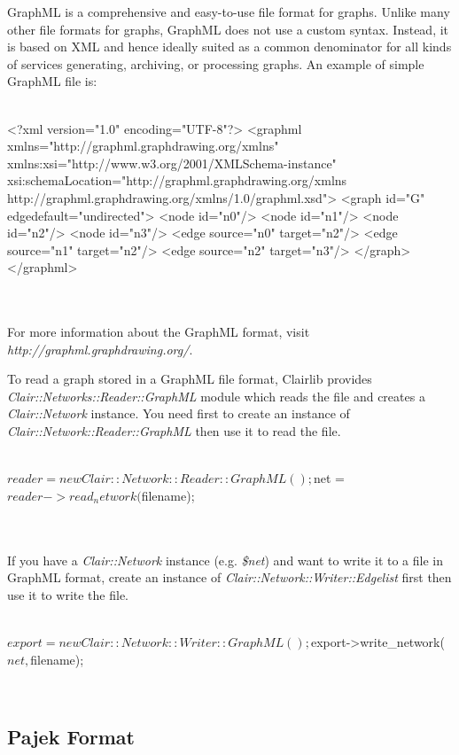 GraphML is a comprehensive and easy-to-use file format for graphs. Unlike many other file formats for graphs, GraphML does not use a custom syntax. Instead, it is based on XML and hence ideally suited as a common denominator for all kinds of services generating, archiving, or processing graphs. An example of simple GraphML file is:
\\
\\
\begin{boxedverbatim}
<?xml version="1.0" encoding="UTF-8"?>
<graphml xmlns="http://graphml.graphdrawing.org/xmlns"
    xmlns:xsi="http://www.w3.org/2001/XMLSchema-instance"
    xsi:schemaLocation="http://graphml.graphdrawing.org/xmlns
     http://graphml.graphdrawing.org/xmlns/1.0/graphml.xsd">
  <graph id="G" edgedefault="undirected">
    <node id="n0"/>
    <node id="n1"/>
    <node id="n2"/>
    <node id="n3"/>
    <edge source="n0" target="n2"/>
    <edge source="n1" target="n2"/>
    <edge source="n2" target="n3"/>
  </graph>
</graphml>
\end{boxedverbatim}
\\
\\
For more information about the GraphML format, visit \emph{http://graphml.graphdrawing.org/}.

To read a graph stored in a GraphML file format, Clairlib provides \emph{Clair::Networks::Reader::GraphML} module which reads the file and creates a \emph{Clair::Network} instance. You need first to create an instance of \emph{Clair::Network::Reader::GraphML} then use it to read the file.
\\
\\
\begin{boxedverbatim}
$reader = new Clair::Network::Reader::GraphML();
$net = $reader->read_network($filename);
\end{boxedverbatim}
\\
\\
If you have a \emph{Clair::Network} instance (e.g. \emph{\$net}) and want to write it to a file in GraphML format, create an instance of \emph{Clair::Network::Writer::Edgelist} first then use it to write the file.
\\
\\
\begin{boxedverbatim}
$export = new Clair::Network::Writer::GraphML();
$export->write_network($net, $filename);
\end{boxedverbatim}
\\
\subsection{Pajek Format}

